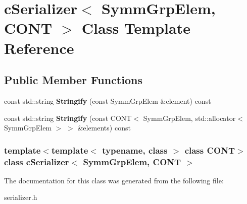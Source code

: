 \hypertarget{classcSerializer_3_01SymmGrpElem_00_01CONT_01_4}{
\section{c\-Serializer$<$ \-Symm\-Grp\-Elem, \-C\-O\-N\-T $>$ \-Class \-Template \-Reference}
\label{classcSerializer_3_01SymmGrpElem_00_01CONT_01_4}
}
\subsection*{\-Public \-Member \-Functions}
\begin{DoxyCompactItemize}
\item 
\hypertarget{classcSerializer_3_01SymmGrpElem_00_01CONT_01_4_a9f2b83d7cb75cfad5bd2a1c15fa968c1}{
const std\-::string {\bfseries \-Stringify} (const \-Symm\-Grp\-Elem \&element) const }
\label{classcSerializer_3_01SymmGrpElem_00_01CONT_01_4_a9f2b83d7cb75cfad5bd2a1c15fa968c1}

\item 
\hypertarget{classcSerializer_3_01SymmGrpElem_00_01CONT_01_4_adc87f8732b096f7add2f18f486bada73}{
const std\-::string {\bfseries \-Stringify} (const \-C\-O\-N\-T$<$ \-Symm\-Grp\-Elem, std\-::allocator$<$ \-Symm\-Grp\-Elem $>$ $>$ \&elements) const }
\label{classcSerializer_3_01SymmGrpElem_00_01CONT_01_4_adc87f8732b096f7add2f18f486bada73}

\end{DoxyCompactItemize}
\subsubsection*{template$<$template$<$ typename, class $>$ class \-C\-O\-N\-T$>$ class c\-Serializer$<$ Symm\-Grp\-Elem, C\-O\-N\-T $>$}



\-The documentation for this class was generated from the following file\-:\begin{DoxyCompactItemize}
\item 
serializer.\-h\end{DoxyCompactItemize}
